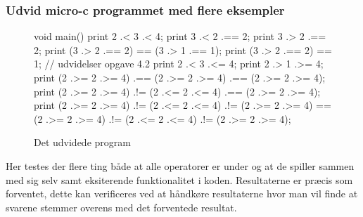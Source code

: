 \subsubsection{Udvid micro-c programmet med flere eksempler}
\begin{figure}[!ht]
\begin{ccode}
void main(){
    print 2 .< 3 .< 4;
    print 3 .< 2 .== 2;
    print 3 .> 2 .== 2;
    print (3 .> 2 .== 2) == (3 .> 1 .== 1);
    print (3 .> 2 .== 2) == 1;
    // udvidelser opgave 4.2
    print 2 .< 3 .<= 4;
    print 2 .> 1 .>= 4;
    print (2 .>= 2 .>= 4) .== (2 .>= 2 .>= 4) .== (2 .>= 2 .>= 4);
    print (2 .>= 2 .>= 4) .!= (2 .<= 2 .<= 4) .== (2 .>= 2 .>= 4);
    print (2 .>= 2 .>= 4) .!= (2 .<= 2 .<= 4) .!= (2 .>= 2 .>= 4) == (2 .>= 2 .>= 4) .!= (2 .<= 2 .<= 4) .!= (2 .>= 2 .>= 4);
}
\end{ccode}
\caption{Det udvidede program}
\end{figure}
Her testes der flere ting både at alle operatorer er under og at de spiller sammen med sig selv samt eksiterende funktionalitet i koden. Resultaterne er præcis som forventet, dette kan verificeres ved at håndkøre resultaterne hvor man vil finde at svarene stemmer overens med det forventede resultat.